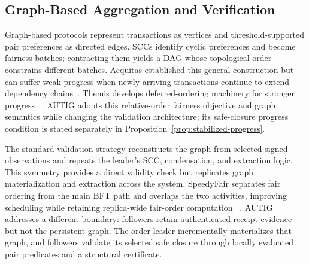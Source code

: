\subsection{Graph-Based Aggregation and Verification}
\label{sec:background_architectures}

Graph-based protocols represent transactions as vertices and
threshold-supported pair preferences as directed edges.  SCCs identify cyclic
preferences and become fairness batches; contracting them yields a DAG whose
topological order constrains different batches.  Aequitas established this
general construction but can suffer weak progress when newly arriving
transactions continue to extend dependency chains~\cite{kelkar2020order}.
Themis develops deferred-ordering machinery for stronger progress
~\cite{kelkar2023themis}.  AUTIG adopts this relative-order fairness objective
and graph semantics while changing the validation architecture; its
safe-closure progress condition is stated separately in
Proposition~\ref{prop:stabilized-progress}.

The standard validation strategy reconstructs the graph from selected signed
observations and repeats the leader's SCC, condensation, and extraction logic.
This symmetry provides a direct validity check but replicates graph
materialization and extraction across the system.  SpeedyFair separates fair
ordering from the main BFT path and overlaps the two activities, improving
scheduling while retaining replica-wide fair-order computation
~\cite{mu2024separation}.  AUTIG addresses a different boundary: followers
retain authenticated receipt evidence but not the persistent graph.  The
order leader incrementally materializes that graph, and followers validate its
selected safe closure through locally evaluated pair predicates and a
structural certificate.
